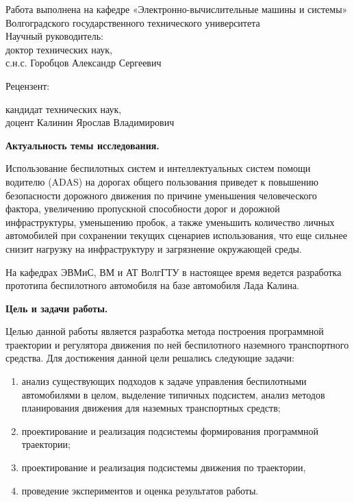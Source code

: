 \begin{nospasing}
\noindent
Работа выполнена на кафедре «Электронно-вычислительные машины и
системы» Волгоградского государственного технического университета\\

\noindent
Научный руководитель:\\

    \setlength{\leftskip}{3cm}
    \noindent
    доктор технических наук, \\
    с.н.с. Горобцов Александр Сергеевич \\

    \setlength{\leftskip}{0pt}

\noindent
Рецензент:

    \setlength{\leftskip}{3cm}
    \noindent
    кандидат технических наук, \\
    доцент Калинин Ярослав Владимирович

    \setlength{\leftskip}{0pt}

\end{nospasing}

\newpage
  

\textbf{Актуальность темы исследования.}

Использование беспилотных систем и интеллектуальных систем помощи водителю (ADAS) на дорогах общего
пользования приведет к повышению безопасности дорожного движения по причине уменьшения человеческого
фактора, увеличению пропускной способности дорог и дорожной инфраструктуры, уменьшению пробок, а также
уменьшить количество личных автомобилей при сохранении текущих сценариев использования, что еще
сильнее снизит нагрузку на инфраструктуру и загрязнение окружающей среды.

На кафедрах ЭВМиС, ВМ и АТ ВолгГТУ в настоящее время ведется разработка прототипа беспилотного
автомобиля на базе автомобиля Лада Калина.

\textbf{Цель и задачи работы.}

Целью данной работы является разработка метода построения программной траектории и регулятора движения по ней
беспилотного наземного транспортного средства.
Для достижения данной цели решались следующие задачи:
\begin{enumerate}
    \item анализ существующих подходов к задаче управления беспилотными автомобилями в целом, выделение
          типичных подсистем, анализ методов планирования движения для наземных транспортных средств;
    \item проектирование и реализация подсистемы формирования программной траектории;
    \item проектирование и реализация подсистемы движения по траектории,
    \item проведение экспериментов и оценка результатов работы.
\end{enumerate}

